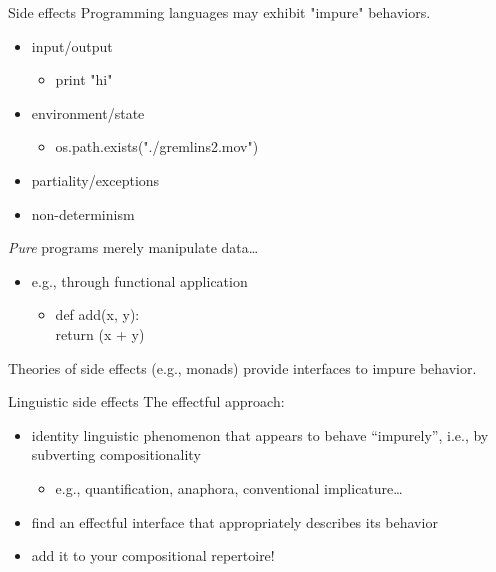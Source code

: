 \documentclass[presentation]{beamer}
\begin{document}
\begin{frame}[label={sec:orga6e8859}]{Side effects}
Programming languages may exhibit "impure" behaviors.
\pause
\begin{itemize}[<+->]
\item input/output
\begin{itemize}
\item print "hi"
\end{itemize}
\item environment/state
\begin{itemize}
\item os.path.exists("./gremlins2.mov")
\end{itemize}
\item partiality/exceptions
\item non-determinism
\end{itemize}

\pause
\emph{Pure} programs merely manipulate data\ldots
\pause
\begin{itemize}
\item e.g., through functional application
\begin{itemize}
\item def add(x, y):\\
\hspace{5mm}return (x + y)
\end{itemize}
\end{itemize}

\bigskip

\pause
\alert{Theories of side effects (e.g., monads) provide interfaces to impure behavior.} 
\end{frame}

\begin{frame}[label={sec:org1b64c63}]{Linguistic side effects}
The effectful approach:
\pause
\begin{itemize}[<+->]
\item identity linguistic phenomenon that appears to behave ``impurely'', i.e., by subverting compositionality
\begin{itemize}
\item e.g., quantification, anaphora, conventional implicature\ldots
\end{itemize}
\item find an effectful interface that appropriately describes its behavior
\item add it to your compositional repertoire!
\end{itemize}
\end{frame}
\end{document}
